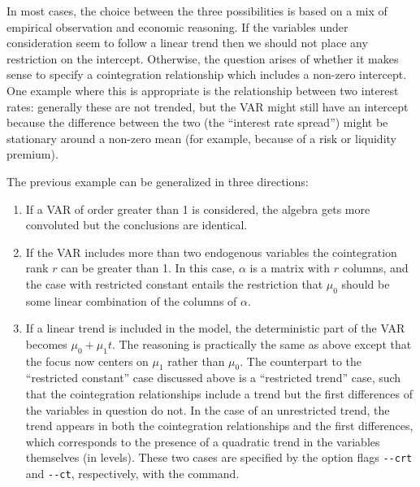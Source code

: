 In most cases, the choice between the three possibilities is based on
a mix of empirical observation and economic reasoning. If the
variables under consideration seem to follow a linear trend then we
should not place any restriction on the intercept. Otherwise, the
question arises of whether it makes sense to specify a cointegration
relationship which includes a non-zero intercept. One example where
this is appropriate is the relationship between two interest rates:
generally these are not trended, but the VAR might still have an
intercept because the difference between the two (the ``interest rate
spread'') might be stationary around a non-zero mean (for example,
because of a risk or liquidity premium).
    
The previous example can be generalized in three directions:
    
\begin{enumerate}
\item If a VAR of order greater than 1 is considered, the algebra gets
  more convoluted but the conclusions are identical.
\item If the VAR includes more than two endogenous variables the
  cointegration rank $r$ can be greater than 1. In this case, $\alpha$
  is a matrix with $r$ columns, and the case with restricted constant
  entails the restriction that $\mu_0$ should be some
  linear combination of the columns of $\alpha$.
\item If a linear trend is included in the model, the deterministic
  part of the VAR becomes $\mu_0 + \mu_1 t$. The reasoning is
  practically the same as above except that the focus now centers on
  $\mu_1$ rather than $\mu_0$.  The counterpart to the ``restricted
  constant'' case discussed above is a ``restricted trend'' case, such
  that the cointegration relationships include a trend but the first
  differences of the variables in question do not.  In the case of an
  unrestricted trend, the trend appears in both the cointegration
  relationships and the first differences, which corresponds to the
  presence of a quadratic trend in the variables themselves (in
  levels).  These two cases are specified by the option flags
  \verb+--crt+ and \verb+--ct+, respectively, with the 
  command.
\end{enumerate}



